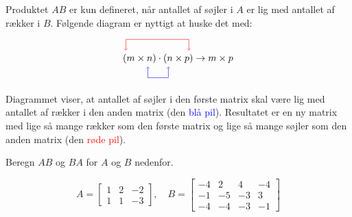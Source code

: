 Produktet $AB$ er kun defineret, når antallet af søjler i $A$ er lig med antallet af rækker i $B$. Følgende diagram er nyttigt at huske det med:


\[
\begin{tikzpicture}
    \node at (0,0) {\((m \times n) \cdot (n \times p) \rightarrow m \times p\)};
    
    \draw[red,<-] (-1.9,0.3) -- (-1.9,0.7) -- (0.4,0.7);
    \draw[red,->] (0.4,0.7) -- (0.4,0.3);
    
    \draw[blue,<-] (-1.1,-0.3) -- (-1.1,-0.7) -- (-0.35,-0.7);
    \draw[blue,->] (-0.35,-0.7) -- (-0.35,-0.3);
\end{tikzpicture}
\]

Diagrammet viser, at antallet af søjler i den første matrix skal være lig med antallet af rækker i den anden matrix (den \textcolor{blue}{blå pil}). Resultatet er en ny matrix med lige så mange rækker som den første matrix og lige så mange søjler som den anden matrix (den \textcolor{red}{røde pil}).

\begin{example}
    Beregn $AB$ og $BA$ for $A$ og $B$ nedenfor.

    \[
    A=\left[\begin{array}{lll}
    1 & 2 & -2 \\
    1 & 1 & -3
    \end{array}\right], \quad B=\left[\begin{array}{cccc}
    -4 & 2 & 4 & -4 \\
    -1 & -5 & -3 & 3 \\
    -4 & -4 & -3 & -1
    \end{array}\right]
    \]
    
\end{example}

